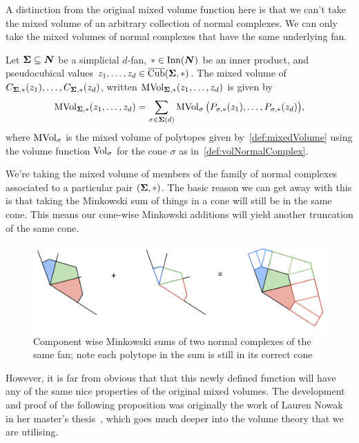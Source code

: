 \documentclass[12pt,oneside]{../../sfsuthesis}
\begin{document}
A distinction from the original mixed volume function here is that we can't take the mixed volume of an arbitrary collection of normal complexes.
We can only take the mixed volumes of normal complexes that have the same underlying fan.

\begin{definition}\th\label{def:mixedVolNormalComplex}
    Let \( {\bm{\Sigma}} \subseteq \bm{N} \) be a simplicial \( d \)-fan, \( \ast \in \operatorname{Inn}(\bm{N}) \) be an inner product, and pseudocubical values \( z_1, \dots, z_d \in \operatorname{\overline{Cub}}({\bm{\Sigma}}, \ast)\).
    The mixed volume of \( C_{{\bm{\Sigma}}, \ast}(z_1), \dots, C_{{\bm{\Sigma}}, \ast}(z_d) \), written \( \operatorname{MVol}_{{\bm{\Sigma}}, \ast}(z_1, \dots, z_d ) \) is given by
    \[
        \operatorname{MVol}_{{\bm{\Sigma}}, \ast}(z_1, \dots, z_d ) = \sum_{\sigma \in {\bm{\Sigma}}(d)} \operatorname{MVol}_\sigma\big(P_{\sigma, \ast}(z_1), \dots, P_{\sigma, \ast}(z_d)\big),
    \]
    where \( \operatorname{MVol}_\sigma \) is the mixed volume of polytopes given by~\th\ref{def:mixedVolume} using the volume function \( \operatorname{Vol}_\sigma \) for the cone \( \sigma \) as in~\th\ref{def:volNormalComplex}.
\end{definition}
We're taking the mixed volume of members of the family of normal complexes associated to a particular pair \( ({\bm{\Sigma}}, \ast) \).
The basic reason we can get away with this is that taking the Minkowski sum of things in a cone will still be in the same cone.
This means our cone-wise Minkowski additions will yield another truncation of the same cone.
\begin{figure}[H]
    \centering
    \includegraphics[width=1.05\textwidth]{./images/mvol_ex}
    \caption{Component wise Minkowski sums of two normal complexes of the same fan; note each polytope in the sum is still in its correct cone}
\end{figure}
However, it is far from obvious that that this newly defined function will have any of the same nice properties of the original mixed volumes.
The development and proof of the following proposition was originally the work of Lauren Nowak in her master's thesis~\cite{nowakMixedVolumesNormal2022}, which goes much deeper into the volume theory that we are utilising.
\end{document}

